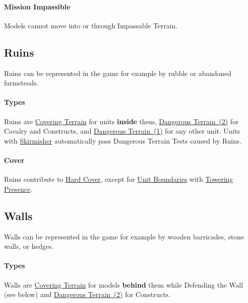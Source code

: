 \paragraph{Mission Impassible}

Models cannot move into or through Impassable Terrain.

\columnbreak

\subsection{Ruins}
\label{ruins}

Ruins can be represented in the game for example by rubble or abandoned farmsteads.

\paragraph{Types}

Ruins are \hyperref[covering_terrain]{Covering Terrain} for units \textbf{inside} them, \hyperref[dangerous_terrain]{Dangerous Terrain~(2)} for Cavalry and Constructs, and \hyperref[dangerous_terrain]{Dangerous Terrain~(1)} for any other unit. Units with \hyperref[skirmisher]{Skirmisher} automatically pass Dangerous Terrain Tests caused by Ruins.

\paragraph{Cover}

Ruins contribute to \hyperref[covering_terrain]{Hard Cover}, except for \hyperref[boundary_rectangle]{Unit Boundaries} with \hyperref[towering_presence]{Towering Presence}.

\subsection{Walls}
\label{walls}

Walls can be represented in the game for example by wooden barricades, stone walls, or hedges.

\paragraph{Types}

Walls are \hyperref[covering_terrain]{Covering Terrain} for models \textbf{behind} them while Defending the Wall (see below) and \hyperref[dangerous_terrain]{Dangerous Terrain~(2)} for Constructs.

